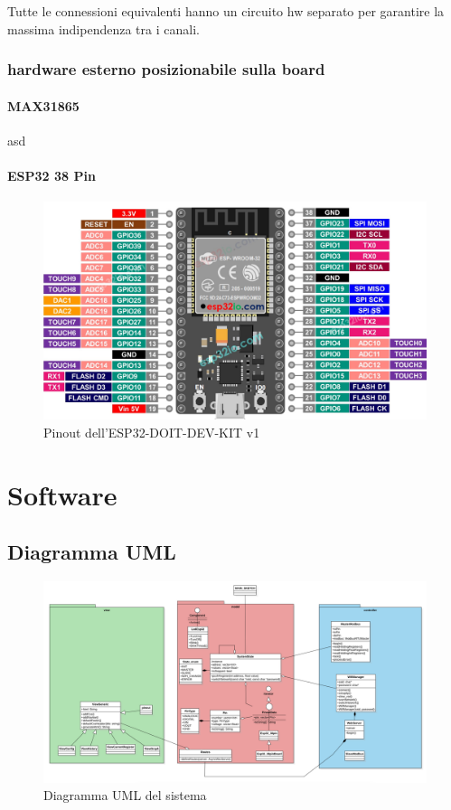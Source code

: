 \documentclass[12pt,a4paper]{report}
\begin{document}
Tutte le connessioni equivalenti hanno un circuito hw separato per garantire la massima indipendenza tra i canali.
\subsection{ hardware esterno posizionabile sulla board}
\subsubsection{MAX31865}
asd

\subsubsection{ESP32 38 Pin}

\begin{figure}[H]
    \centering
    \includegraphics[width=\linewidth]{../image/ESP-38Pin-pinout.jpg}
    \caption{Pinout dell'ESP32-DOIT-DEV-KIT v1}
\end{figure}

\chapter{Software}
\section{Diagramma UML}
\begin{figure}[H]
    \centering
    \includegraphics[width=\linewidth]{../image/uml.png}
    \caption{Diagramma UML del sistema}
\end{figure}
\end{document}
